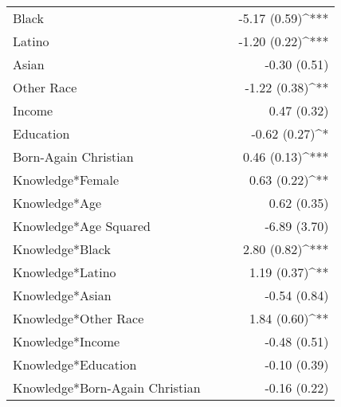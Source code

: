 \begin{tabular}{l D{)}{)}{11)3} D{)}{)}{11)3} D{)}{)}{11)3} }
Black                                       &                       &                       & -5.17 \; (0.59)^{***} \\
Latino                                      &                       &                       & -1.20 \; (0.22)^{***} \\
Asian                                       &                       &                       & -0.30 \; (0.51)       \\
Other Race                                  &                       &                       & -1.22 \; (0.38)^{**}  \\
Income                                      &                       &                       & 0.47 \; (0.32)        \\
Education                                   &                       &                       & -0.62 \; (0.27)^{*}   \\
Born-Again Christian                        &                       &                       & 0.46 \; (0.13)^{***}  \\
Knowledge*Female                            &                       &                       & 0.63 \; (0.22)^{**}   \\
Knowledge*Age                               &                       &                       & 0.62 \; (0.35)        \\
Knowledge*Age Squared                       &                       &                       & -6.89 \; (3.70)       \\
Knowledge*Black                             &                       &                       & 2.80 \; (0.82)^{***}  \\
Knowledge*Latino                            &                       &                       & 1.19 \; (0.37)^{**}   \\
Knowledge*Asian                             &                       &                       & -0.54 \; (0.84)       \\
Knowledge*Other Race                        &                       &                       & 1.84 \; (0.60)^{**}   \\
Knowledge*Income                            &                       &                       & -0.48 \; (0.51)       \\
Knowledge*Education                         &                       &                       & -0.10 \; (0.39)       \\
Knowledge*Born-Again Christian              &                       &                       & -0.16 \; (0.22)       \\

\end{tabular}
